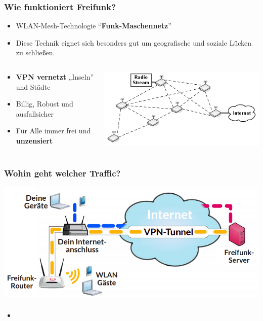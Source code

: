 \begin{frame}
\frametitle{Wie funktioniert Freifunk?}
	\begin{itemize}
		\item WLAN-Mesh-Technologie “\textbf{Funk-Maschennetz}”
		\item Diese Technik eignet sich besonders gut um geografische und soziale Lücken zu schließen.
	\end{itemize}
	\begin{columns}[c]   
		\begin{column}[T]{0.4\textwidth}     
			\begin{itemize}
				\item \textbf{VPN vernetzt} „Inseln” und Städte
				\item Billig, Robust und ausfallsicher
				\item Für Alle immer frei und \textbf{unzensiert}
			\end{itemize}
		\end{column} 
		\begin{column}[T]{0.5\textwidth}     
			\includegraphics[width=\textwidth]{images/mesh_uebersicht.png}   
		\end{column}
	\end{columns} 
\end{frame}


\begin{frame}
\frametitle{Wohin geht welcher Traffic?}
	\includegraphics[scale=0.4]{images/personal_setup.png}
\end{frame}



\begin{frame}
\frametitle{}
	\begin{itemize}
		\item 
	\end{itemize}
\end{frame}
